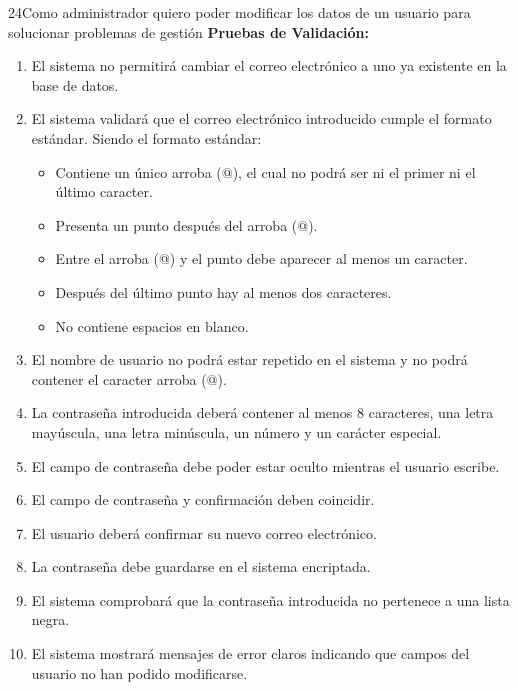 \begin{hu_card}{24}{Como administrador quiero poder modificar los datos de un usuario para solucionar problemas de gestión}
    \vspace{2mm}
    \textbf{Pruebas de Validación:}
    \begin{enumerate}[noitemsep, topsep=0pt]
        \item El sistema no permitirá cambiar el correo electrónico a uno ya existente en la base de datos.
        \item El sistema validará que el correo electrónico introducido cumple el formato estándar. Siendo el formato estándar: 
            \begin{itemize}
                \item Contiene un único arroba (@), el cual no podrá ser ni el primer ni el último caracter.
                \item Presenta un punto después del arroba (@).
                \item Entre el arroba (@) y el punto debe aparecer al menos un caracter.
                \item Después del último punto hay al menos dos caracteres.
                \item No contiene espacios en blanco.
            \end{itemize}
        \item El nombre de usuario no podrá estar repetido en el sistema y no podrá contener el caracter arroba (@).
        \item La contraseña introducida deberá contener al menos 8 caracteres, una letra mayúscula, una letra minúscula, un número y un carácter especial.
        \item El campo de contraseña debe poder estar oculto mientras el usuario escribe.
        \item El campo de contraseña y confirmación deben coincidir.
        \item El usuario deberá confirmar su nuevo correo electrónico.
        \item La contraseña debe guardarse en el sistema encriptada.
        \item El sistema comprobará que la contraseña introducida no pertenece a una lista negra.
        \item El sistema mostrará mensajes de error claros indicando que campos del usuario no han podido modificarse.
    \end{enumerate}
\end{hu_card}

